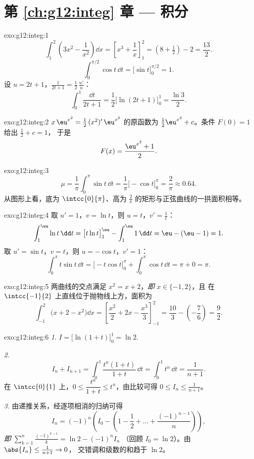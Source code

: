 \section*{第 \ref{ch:g12:integ} 章 --- 积分}

\begin{solution}{exo:g12:integ:1}
\[
\int_1^2 \left(3x^2 - \frac{1}{x^2}\right)\dd x
= \left[x^3 + \frac1x\right]_1^2 = \left(8 + \tfrac12\right) - 2 = \frac{13}{2}.
\]
\[
\int_0^{\pi/2} \cos t\,\dd t = \bigl[\sin t\bigr]_0^{\pi/2} = 1 .
\]
设 $u = 2t+1$，$\frac{1}{2t+1} = \frac12\,\frac{u'}{u}$：
\[
\int_0^1 \frac{\dd t}{2t+1} = \frac12\bigl[\ln(2t+1)\bigr]_0^1
= \frac{\ln 3}{2}.
\]
\end{solution}

\begin{solution}{exo:g12:integ:2}
$x\,\eu^{x^2} = \frac12\,(x^2)'\,\eu^{x^2}$ 的原函数为
$\frac12\eu^{x^2} + c$。条件 $F(0) = 1$ 给出 $\frac12 + c = 1$，
于是
\[
F(x) = \frac{\eu^{x^2} + 1}{2}.
\]
\end{solution}

\begin{solution}{exo:g12:integ:3}
\[
\mu = \frac{1}{\pi}\int_0^\pi \sin t\,\dd t
= \frac{1}{\pi}\bigl[-\cos t\bigr]_0^\pi = \frac{2}{\pi} \approx 0.64 .
\]
从图形上看，底为 $\intcc{0}{\pi}$、高为
$\frac{2}{\pi}$ 的矩形与正弦曲线的一拱面积相等。
\end{solution}

\begin{solution}{exo:g12:integ:4}
取 $u' = 1$，$v = \ln t$，则 $u = t$，$v' = \frac1t$：
\[
\int_1^{\eu} \ln t\,\dd t = \bigl[t\ln t\bigr]_1^{\eu} - \int_1^{\eu} 1\,\dd t
= \eu - (\eu - 1) = 1 .
\]
取 $u' = \sin t$，$v = t$，则 $u = -\cos t$，$v' = 1$：
\[
\int_0^\pi t\sin t\,\dd t = \bigl[-t\cos t\bigr]_0^\pi + \int_0^\pi \cos t\,\dd t
= \pi + 0 = \pi .
\]
\end{solution}

\begin{solution}{exo:g12:integ:5}
两曲线的交点满足 $x^2 = x + 2$，\emph{即} $x \in \{-1, 2\}$，且
在 $\intcc{-1}{2}$ 上直线位于抛物线上方，面积为
\[
\int_{-1}^{2} \bigl(x + 2 - x^2\bigr)\dd x
= \left[\frac{x^2}{2} + 2x - \frac{x^3}{3}\right]_{-1}^{2}
= \frac{10}{3} - \left(-\frac{7}{6}\right) = \frac{9}{2}.
\]
\end{solution}

\begin{solution}{exo:g12:integ:6}
\emph{1.} $I = \bigl[\ln(1+t)\bigr]_0^1 = \ln 2$.

\emph{2.}
\[
I_n + I_{n+1} = \int_0^1 \frac{t^n(1 + t)}{1+t}\,\dd t
= \int_0^1 t^n \,\dd t = \frac{1}{n+1}.
\]
在 $\intcc{0}{1}$ 上，$0 \leq \dfrac{t^n}{1+t} \leq t^n$，由比较可得
$0 \leq I_n \leq \frac{1}{n+1}$。

\emph{3.} 由递推关系，经逐项相消的归纳可得
\[
I_n = (-1)^n\left(I_0 - \left(1 - \frac12 + \dots + \frac{(-1)^{n-1}}{n}\right)\right),
\]
\emph{即}
$\displaystyle\sum_{k=1}^{n} \frac{(-1)^{k-1}}{k} = \ln 2 - (-1)^n I_n$
（回顾 $I_0 = \ln 2$）。由 $\abs{I_n} \leq \frac{1}{n+1} \to 0$，
交错调和级数的和趋于 $\ln 2$。
\end{solution}


